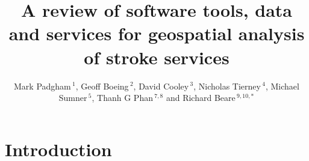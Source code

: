 \documentclass[utf8]{frontiersHLTH}
\def\firstAuthorLast{FirstAuthor {et~al.}} %
\def\Authors{Mark Padgham\,$^{1}$, Geoff Boeing\,$^{2}$, David Cooley\,$^{3}$, Nicholas Tierney\,$^{4}$, Michael Sumner\,$^{5}$, Thanh G Phan\,$^{7,8}$ and Richard Beare\,$^{9,10,*}$}
\begin{document}
\onecolumn
{}

\title[Software tools for geospatial analysis]{A review of software tools, data and services for geospatial analysis of stroke services}

\author[\firstAuthorLast ]{\Authors} %
\address{} %
\correspondance{} %

\extraAuth{}%

\maketitle

\section{Introduction}\label{introduction}
\end{document}
